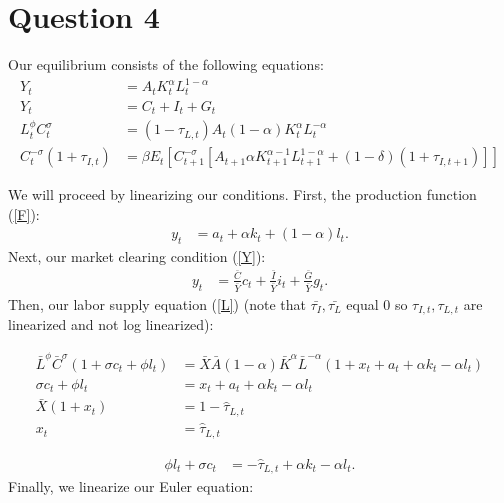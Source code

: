 \documentclass[11pt]{article} %
\begin{document}
\section{Question 4}
Our equilibrium consists of the following equations:
\begin{align}
Y_{t} &= A_tK_t^{\alpha}L_t^{1-\alpha} \label{F}\\
Y_{t} &= C_{t} + I_{t} + G_{t} \label{Y}\\
L_{t}^{\phi}C_t^{\sigma} &= (1-\tau_{L,t})A_t(1-\alpha) K_t^{\alpha}L_t^{-\alpha} \label{L}\\
C_t^{-\sigma}(1+\tau_{I,t}) &= \beta E_t[C_{t+1}^{-\sigma}[A_{t+1}\alpha K_{t+1}^{\alpha-1}L_{t+1}^{1-\alpha} + (1-\delta)(1+\tau_{I,t+1})]] \label{EE}
\end{align}

We will proceed by linearizing our conditions. First, the production function (\ref{F}):
\begin{align}
y_t &= a_t + \alpha k_t + (1-\alpha) l_t. \label{f}
\end{align}
Next, our market clearing condition (\ref{Y}):
\begin{align}
y_t &= \frac{\bar{C}}{\bar{Y}}c_t + \frac{\bar{I}}{\bar{Y}} i_t + \frac{\bar{G}}{\bar{Y}} g_t. \label{y}
\end{align}
Then, our labor supply equation (\ref{L}) (note that $\bar{\tau_{I}},\bar{\tau_{L}}$ equal 0 so $\tau_{I,t},\tau_{L,t}$ are linearized and not log linearized):

\begin{align*}
\bar{L}^{\phi}\bar{C}^{\sigma}(1+\sigma c_t + \phi l_t) &= \bar{X} \bar{A}(1-\alpha) \bar{K}^{\alpha}\bar{L}^{-\alpha}(1+x_t + a_t + \alpha k_t - \alpha l_t) \\
\sigma c_t + \phi l_t &= x_t + a_t + \alpha k_t - \alpha l_t\\
\bar{X}(1+x_t) &= 1-\hat{\tau}_{L,t}\\
x_t &=\hat{\tau}_{L,t}
\end{align*}

\begin{align}
\phi l_t + \sigma c_t &= -\hat{\tau}_{L,t}+\alpha k_t -\alpha l_t. \label{l}
\end{align}
Finally, we linearize our Euler equation:
\end{document}
